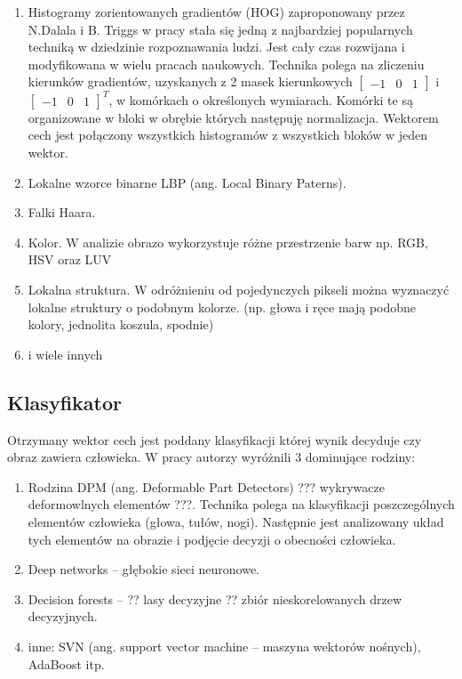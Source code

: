 \begin{enumerate}
\item Histogramy zorientowanych gradientów (HOG) zaproponowany przez N.Dalala i B. Triggs w pracy \cite{dalal2005histograms} stała się jedną z najbardziej popularnych techniką w dziedzinie rozpoznawania ludzi. Jest cały czas rozwijana i modyfikowana w wielu pracach naukowych. Technika polega na zliczeniu kierunków gradientów, uzyskanych z 2 masek kierunkowych \(\begin{bmatrix}-1 & 0 & 1\end{bmatrix} \) i \( \begin{bmatrix}-1 & 0 & 1 \end{bmatrix}^T\), w komórkach o określonych wymiarach. Komórki te są organizowane w bloki w obrębie których następuję normalizacja. Wektorem cech jest połączony wszystkich histogramów z wszystkich bloków w jeden wektor.

\item Lokalne wzorce binarne LBP (ang. Local Binary Paterns). 

\item Falki Haara.

\item Kolor. W analizie obrazo wykorzystuje różne przestrzenie barw np. RGB, HSV oraz LUV

\item Lokalna struktura. W odróżnieniu od pojedynczych pikseli można wyznaczyć lokalne struktury o podobnym kolorze. (np. głowa i ręce mają podobne kolory, jednolita koszula, spodnie)

\item i wiele innych

\end{enumerate}

\subsection{Klasyfikator}
Otrzymany wektor cech jest poddany klasyfikacji której wynik decyduje czy obraz zawiera człowieka. W pracy \cite{benenson2014ten} autorzy wyróżnili 3 dominujące rodziny:

\begin{enumerate}
\item Rodzina DPM (ang. Deformable Part Detectors) ??? wykrywacze deformowlnych elementów ???. Technika polega na klasyfikacji poszczególnych elementów człowieka (głowa, tułów, nogi). Następnie  jest analizowany układ tych elementów na obrazie i podjęcie decyzji o obecności człowieka.

\item Deep networks – głębokie sieci neuronowe.

\item Decision forests – ?? lasy decyzyjne ?? zbiór nieskorelowanych drzew decyzyjnych.

\item inne: SVN (ang. support vector machine – maszyna wektorów nośnych), AdaBoost itp.
\end{enumerate}

